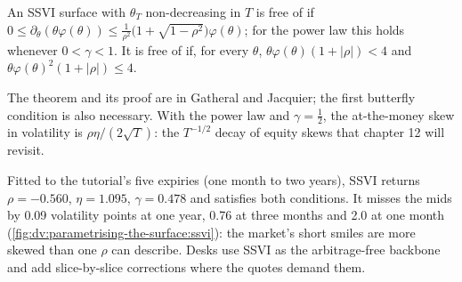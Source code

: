 \begin{theorem}\label{thm:dv:parametrising-the-surface:ssvi}
An SSVI surface with $\theta_T$ non-decreasing in $T$ is free of  if
$0\le\partial_\theta(\theta\varphi(\theta))\le\frac{1}{\rho^2}\bigl(1+\sqrt{1-\rho^2}\bigr)\varphi(\theta)$;
for the power law this holds whenever $0<\gamma<1$. It is free of  if, for
every $\theta$, $\theta\varphi(\theta)(1+|\rho|)<4$ and $\theta\varphi(\theta)^2(1+|\rho|)\le4$.
\end{theorem}
\admitted

The theorem and its proof are in Gatheral and Jacquier; the first butterfly condition is also
necessary. With the power law and $\gamma=\tfrac12$, the at-the-money skew in volatility is
$\rho\eta/(2\sqrt T)$: the $T^{-1/2}$ decay of equity skews that chapter 12 will revisit.

\begin{example}\label{ex:dv:parametrising-the-surface:ssvi}
Fitted to the tutorial's five expiries (one month to two years), SSVI returns $\rho=-0.560$,
$\eta=1.095$, $\gamma=0.478$ and satisfies both conditions. It misses the mids by 0.09 volatility
points at one year, 0.76 at three months and 2.0 at one month
(\cref{fig:dv:parametrising-the-surface:ssvi}): the market's short smiles are more skewed than
one $\rho$ can describe. Desks use SSVI as the arbitrage-free backbone and add slice-by-slice
corrections where the quotes demand them.
\end{example}

